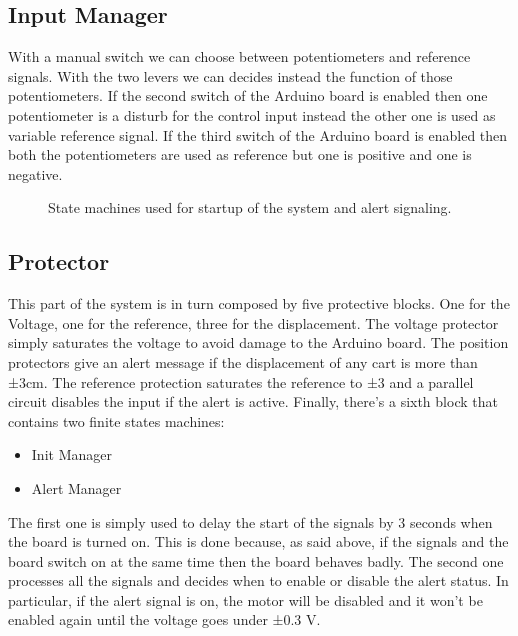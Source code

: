 \subsection{Input Manager}
With a manual switch we can choose between potentiometers and reference signals. With the two levers we can decides instead the function of those potentiometers. 
If the second switch of the Arduino board is enabled then one potentiometer is a disturb for the control input instead the other one is used as variable reference signal. 
If the third switch of the Arduino board is enabled then both the potentiometers are used as reference but one is positive and one is negative. 
 \begin{figure}[!h]
 	\centering
 	\hspace{1cm}
 	
 	\caption{State machines used for startup of the system and alert signaling.}
 	
 \end{figure}
\subsection{Protector}
This part of the system is in turn composed by five protective blocks. One for the Voltage, one for the reference, three for the displacement. 
The voltage protector simply saturates the voltage to avoid damage to the Arduino board.
The position protectors give an alert message if the displacement of any cart is more than ±3cm.
The reference protection saturates the reference to ±3 and a parallel circuit disables the input if the alert is active.
Finally, there’s a sixth block that contains two finite states machines: 
\begin{itemize}
	\item Init Manager
	\item Alert Manager
\end{itemize}
The first one is simply used to delay the start of the signals by 3 seconds when the board is turned on. This is done because, as said above, if the signals and the board switch on at the same time then the board behaves badly. 
The second one processes all the signals and decides when to enable or disable the alert status. In particular, if the alert signal is on, the motor will be disabled and it won’t be enabled again until the voltage goes under ±0.3 V. 

